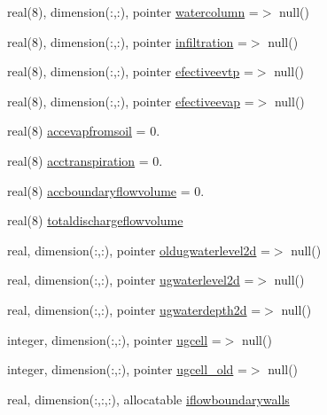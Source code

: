 \begin{DoxyCompactItemize}
\item 
real(8), dimension(\+:,\+:), pointer \mbox{\hyperlink{structmoduleporousmedia_1_1t__porousmedia_adb08d811e5e863737632ba11c3106b10}{watercolumn}} =$>$ null()
\item 
real(8), dimension(\+:,\+:), pointer \mbox{\hyperlink{structmoduleporousmedia_1_1t__porousmedia_af6724a7c034857a69640c7110372e439}{infiltration}} =$>$ null()
\item 
real(8), dimension(\+:,\+:), pointer \mbox{\hyperlink{structmoduleporousmedia_1_1t__porousmedia_a54bd0e5dd58715eb49a45a4d6dedc562}{efectiveevtp}} =$>$ null()
\item 
real(8), dimension(\+:,\+:), pointer \mbox{\hyperlink{structmoduleporousmedia_1_1t__porousmedia_ae3af4deebc7a55db714e5b16025482b3}{efectiveevap}} =$>$ null()
\item 
real(8) \mbox{\hyperlink{structmoduleporousmedia_1_1t__porousmedia_adc6ba2da072a61200939ece1c56acb06}{accevapfromsoil}} = 0.
\item 
real(8) \mbox{\hyperlink{structmoduleporousmedia_1_1t__porousmedia_a17cf25544edc1e5045117c549fc7730e}{acctranspiration}} = 0.
\item 
real(8) \mbox{\hyperlink{structmoduleporousmedia_1_1t__porousmedia_a10029826da5627b6e1c0bc2999886702}{accboundaryflowvolume}} = 0.
\item 
real(8) \mbox{\hyperlink{structmoduleporousmedia_1_1t__porousmedia_a5747bfc030cd93dd90dcb0dd0fb2b98c}{totaldischargeflowvolume}}
\item 
real, dimension(\+:,\+:), pointer \mbox{\hyperlink{structmoduleporousmedia_1_1t__porousmedia_a3e3b1291b183281b55cb8df4ce938adf}{oldugwaterlevel2d}} =$>$ null()
\item 
real, dimension(\+:,\+:), pointer \mbox{\hyperlink{structmoduleporousmedia_1_1t__porousmedia_ac9bdca163649556439fc02a2b2195417}{ugwaterlevel2d}} =$>$ null()
\item 
real, dimension(\+:,\+:), pointer \mbox{\hyperlink{structmoduleporousmedia_1_1t__porousmedia_a39cb88c9147e7e4f914c16a210f74080}{ugwaterdepth2d}} =$>$ null()
\item 
integer, dimension(\+:,\+:), pointer \mbox{\hyperlink{structmoduleporousmedia_1_1t__porousmedia_a854d91ef6583360cd76bbbefcfd3ccc6}{ugcell}} =$>$ null()
\item 
integer, dimension(\+:,\+:), pointer \mbox{\hyperlink{structmoduleporousmedia_1_1t__porousmedia_a7dc6d3fe96a93a7bdb1200b5f855fc5d}{ugcell\+\_\+old}} =$>$ null()
\item 
real, dimension(\+:,\+:,\+:), allocatable \mbox{\hyperlink{structmoduleporousmedia_1_1t__porousmedia_a4ea547e440bb6fcf36f6412a6b02752b}{iflowboundarywalls}}

\end{DoxyCompactItemize}
